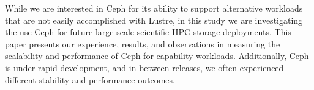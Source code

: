 While we are interested in Ceph for its ability to support
alternative workloads that are not easily accomplished with Lustre, in this
study we are investigating the use Ceph for future
large-scale scientific HPC storage deployments. This paper presents our
experience, results, and observations in measuring the scalability and
performance of Ceph for capability workloads.  Additionally, Ceph is under
rapid development, and in  between releases, we often
experienced different stability and performance outcomes.  


